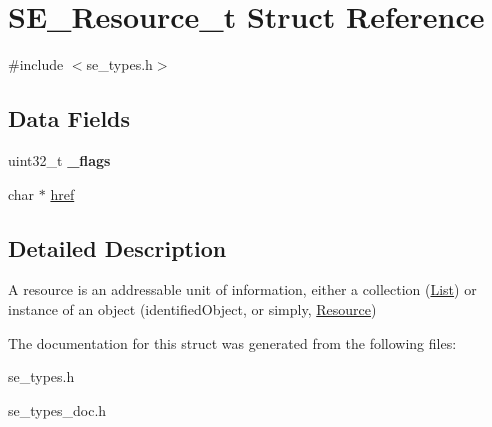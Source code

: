 \hypertarget{structSE__Resource__t}{}\section{S\+E\+\_\+\+Resource\+\_\+t Struct Reference}
\label{structSE__Resource__t}


{\ttfamily \#include $<$se\+\_\+types.\+h$>$}

\subsection*{Data Fields}
\begin{DoxyCompactItemize}
\item 
uint32\+\_\+t {\bfseries \+\_\+flags}
\item 
char $\ast$ \hyperlink{group__Resource_gab28da8155327844e859d3d90bf37f2ec}{href}
\end{DoxyCompactItemize}


\subsection{Detailed Description}
A resource is an addressable unit of information, either a collection (\hyperlink{structList}{List}) or instance of an object (identified\+Object, or simply, \hyperlink{structResource}{Resource}) 

The documentation for this struct was generated from the following files\+:\begin{DoxyCompactItemize}
\item 
se\+\_\+types.\+h\item 
se\+\_\+types\+\_\+doc.\+h\end{DoxyCompactItemize}
